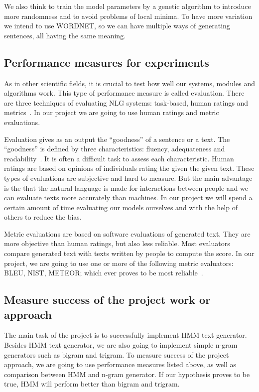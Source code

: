 \documentclass[a4paper,12pt]{article}
\begin{document}
We also think to train the model parameters by a genetic algorithm to introduce
more randomness and to avoid problems of local minima.
To have more variation we intend to use WORDNET, so we can have multiple ways of
generating sentences, all having the same meaning.


\subsection {Performance measures for experiments}

As in other scientific fields, it is crucial to test how well our systems,
modules and algorithms work. This type of performance measure is called
evaluation. There are three techniques of evaluating NLG systems: task-based,
human ratings and metrics~\cite{evalnlg}. In our project we are going to use
human ratings and metric evaluations.

Evaluation gives as an output the ``goodness'' of a sentence or a text. The
``goodness'' is defined by three characteristics: fluency, adequateness and
readability~\cite{evalmethods}. It is often a difficult task to assess each
characteristic.
Human ratings are based on opinions of individuals rating the given the given
text. These types of evaluations are subjective and hard to measure. But the
main advantage is the that the natural language is made for interactions between
people and we can evaluate texts more accurately than machines. In our project
we will spend a certain amount of time evaluating our models ourselves and with
the help of others to reduce the bias.

Metric evaluations are based on software evaluations of generated text. They are
more objective than human ratings, but also less reliable. Most evaluators
compare generated text with texts written by people to compute the score. In our
project, we are going to use one or more of the following metric evaluators:
BLEU, NIST, METEOR; which ever proves to be most reliable~\cite{autoeval}.

\subsection {Measure success of the project work or approach}

The main task of the project is to successfully implement HMM text generator.
Besides HMM text generator, we are also going to implement simple n-gram
generators such as bigram and trigram. To measure success of the project
approach, we are going to use performance measures listed above, as well as
comparison between HMM and n-gram generator. If our hypothesis proves to be
true, HMM will perform better than bigram and trigram.
\end{document}
